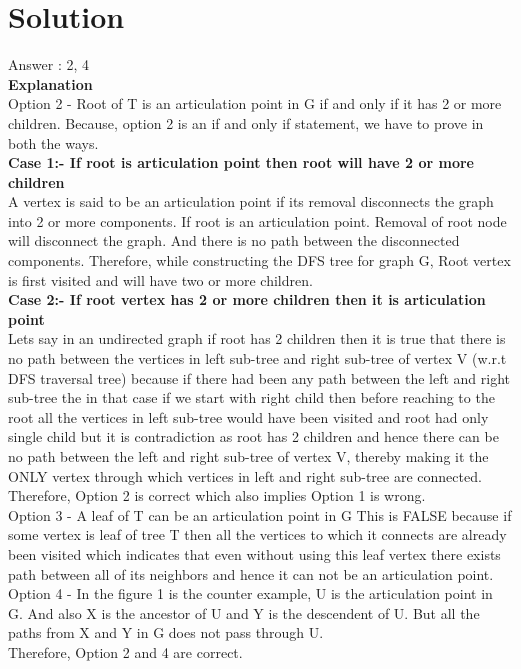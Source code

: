 \documentclass[journal,12pt,twocolumn]{IEEEtran}
\begin{document}
\section{Solution}
Answer : 2, 4
\\
\textbf{Explanation}
\\
Option 2 - Root of T is an articulation point in G if and only if it has 2 or more children. Because, option 2 is an if and only if statement, we have to prove in both the ways. 
\\
\textbf{Case 1:- If root is articulation point then root will have 2 or more children}\\
A vertex is said to be an articulation point if its removal disconnects the graph into 2 or more components. If root is an articulation point. Removal of root node will disconnect the graph. And there is no path between the disconnected components. Therefore, while constructing the DFS tree for graph G, Root vertex is first visited and will have two or more children. 
\\
\textbf{Case 2:- If root vertex has 2 or more children then it is articulation point}\\
Lets say in an undirected graph if root has 2 children then it is true that there is no path between the vertices in left sub-tree and right sub-tree of vertex V (w.r.t DFS traversal tree) because if there had been any path between the left and right sub-tree the in that case if we start with right child then before reaching to the root all the vertices in left sub-tree would have been visited and root had only single child but it is contradiction as root has 2 children and hence there can be no path between the left and right sub-tree of vertex V, thereby making it the ONLY vertex through which vertices in left and right sub-tree are connected.
\\ 
Therefore, Option 2 is correct which also implies Option 1 is wrong.\\
Option 3 - A leaf of T can be an articulation point in G
 This is FALSE because if some vertex is leaf of tree T then all the vertices to which it connects are already been visited which indicates that even without using this leaf vertex there exists path between all of its neighbors and hence it can not be an articulation point.
 \\
 Option 4 - In the figure 1 is the counter example, U is the articulation point in G. And also X is the ancestor of U and Y is the descendent of U. But all the paths from X and Y in G does not pass through U.
\\
Therefore, Option 2 and 4 are correct.
\end{document}
